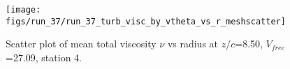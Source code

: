 \begin{figure}[H]
\centering
\texttt{[image: figs/run\_37/run\_37\_turb\_visc\_by\_vtheta\_vs\_r\_meshscatter]}
\caption{Scatter plot of mean total viscosity $\nu$ vs radius at $z/c$=8.50, $V_{free}$=27.09, station 4.}
\label{fig:run_37_turb_visc_by_vtheta_vs_r_meshscatter}
\end{figure}


